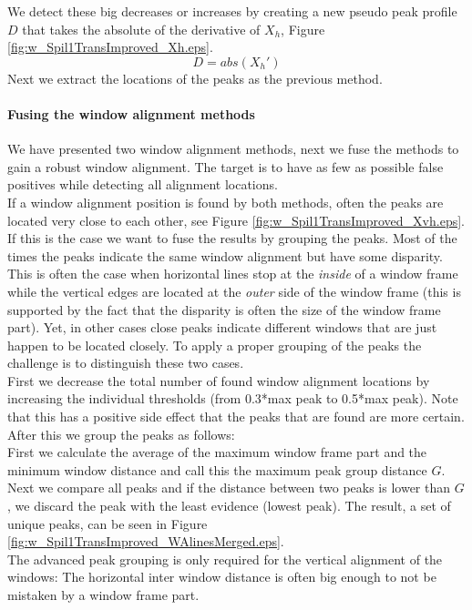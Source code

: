 We detect these big decreases or increases by creating a new pseudo peak profile
$D$ that takes the absolute of the derivative of $X_h$, Figure \ref{fig:w_Spil1TransImproved_Xh.eps}.
\[D = abs( X_{h}')\]
Next we extract the locations of the peaks as the previous method.

\paragraph{Fusing the window alignment methods}
We have presented two window alignment methods, next we fuse the methods to
gain a robust window alignment.
The target is to have as few as possible false positives while detecting all alignment locations.\\

If a window alignment position is found by both methods, often the peaks are
located very close to each other, see Figure
\ref{fig:w_Spil1TransImproved_Xvh.eps}.  If this is the case we want to fuse the results by grouping the peaks.
Most of the times the peaks indicate the same window alignment but have
some disparity.  This is often the case when horizontal lines stop at the \emph{inside}
of a window frame while the vertical edges are located at the \emph{outer} side of the
window frame (this is supported by the fact that the disparity is often the size of the window frame part).  
Yet, in other cases close peaks indicate different windows that are just happen to be
located closely.  To apply a proper grouping of the peaks the challenge is to
distinguish these two cases.\\

First we decrease the total number of found window alignment locations by increasing the individual thresholds (from 0.3*max
peak to 0.5*max peak). Note that this has a positive side effect that the peaks that are found are more certain.
After this we group the peaks as follows: \\
First we calculate the average of the maximum window frame part and the minimum window
distance and call this the maximum peak group distance $G$.
Next we compare all peaks and if the distance between two peaks is lower than
$G$, we discard the peak with the least evidence (lowest peak). The result,
a set of unique peaks, can be seen in Figure \ref{fig:w_Spil1TransImproved_WAlinesMerged.eps}.\\

The advanced peak grouping is only required for the vertical alignment
of the windows: The horizontal inter window distance is often big enough to not
be mistaken by a window frame part.

